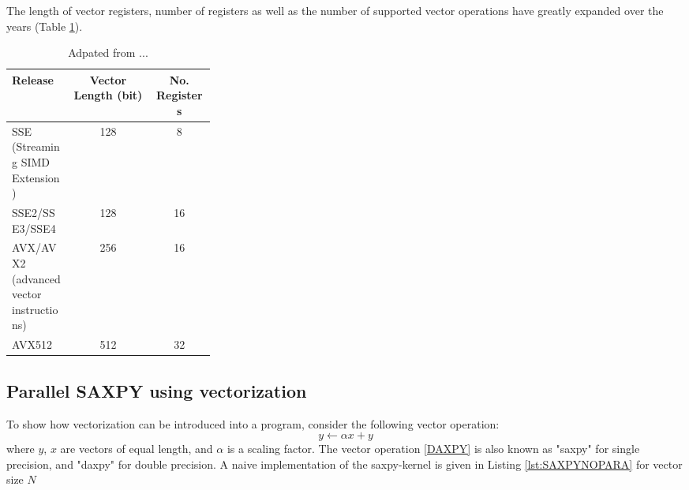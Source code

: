 The length of vector registers, number of registers as well as the number of supported vector operations have greatly expanded over the years (Table \ref{VECTORHARDWARE}).

\begin{table}
\makegapedcells
\centering
\begin{tabular}{p{0.3\linewidth}cc}
\hline
Release & Vector Length (bit) & No. Registers \\ \hline
SSE (Streaming SIMD Extension) & 128 & 8 \\ 
SSE2/SSE3/SSE4 & 128 & 16  \\
AVX/AVX2 (advanced vector instructions) & 256 & 16 \\
AVX512 & 512 & 32 \\ 
\hline 
\end{tabular}
\caption{Adpated from ...}
\label{VECTORHARDWARE}
\end{table}

\subsection{Parallel SAXPY using vectorization}

To show how vectorization can be introduced into a program, consider the following vector operation:
\begin{equation}
y \leftarrow \alpha x + y
\label{DAXPY}
\end{equation}
\noindent where $y$, $x$ are vectors of equal length, and $\alpha$ is a scaling factor. The vector operation \ref{DAXPY} is also known as "saxpy" for single precision, and "daxpy" for double precision. A naive implementation of the saxpy-kernel is given in Listing \ref{lst:SAXPYNOPARA} for vector size $N$  



